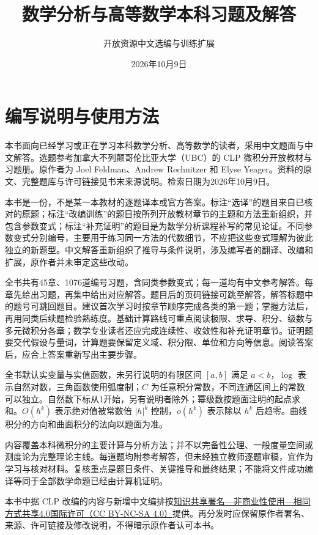 \documentclass[12pt,fontset=fandol]{ctexart}
\title{数学分析与高等数学本科习题及解答}
\author{开放资源中文选编与训练扩展}
\date{2026年10月9日}
\begin{document}
\maketitle
\section*{编写说明与使用方法}
本书面向已经学习或正在学习本科数学分析、高等数学的读者，采用中文题面与中文解答。选题参考加拿大不列颠哥伦比亚大学（UBC）的 CLP 微积分开放教材与习题册。原作者为 Joel Feldman、Andrew Rechnitzer 和 Elyse Yeager。资料的原文、完整题库与许可链接见书末来源说明。检索日期为2026年10月9日。

本书是一份，不是某一本教材的逐题译本或官方答案。标注“选译”的题目来自已核对的原题；标注“改编训练”的题目按所列开放教材章节的主题和方法重新组织，并包含参数变式；标注“补充证明”的题目是为数学分析课程补写的常见论证。不同参数变式分别编号，主要用于练习同一方法的代数细节，不应把这些变式理解为彼此独立的新题型。中文解答重新组织了推导与条件说明，涉及编写者的翻译、改编和扩展，原作者并未审定这些改动。

全书共有45章、1076道编号习题，含同类参数变式；每一道均有中文参考解答。每章先给出习题，再集中给出对应解答。题目后的页码链接可跳至解答，解答标题中的题号可跳回题目。建议首次学习时按章节顺序完成各类的第一题；掌握方法后，再用同类后续题检验熟练度。基础计算路线可重点阅读极限、求导、积分、级数与多元微积分各章；数学专业读者还应完成连续性、收敛性和补充证明章节。证明题要交代假设与量词，计算题要保留定义域、积分限、单位和方向等信息。阅读答案后，应合上答案重新写出主要步骤。

全书默认实变量与实值函数，未另行说明的有限区间 $[a,b]$ 满足 $a<b$，$\log$ 表示自然对数，三角函数使用弧度制；$C$ 为任意积分常数，不同连通区间上的常数可以独立。自然数下标从1开始，另有说明者除外；幂级数按题面注明的起点求和。$O(h^k)$ 表示绝对值被常数倍 $|h|^k$ 控制，$o(h^k)$ 表示除以 $h^k$ 后趋零。曲线积分的方向和曲面积分的法向以题面为准。

内容覆盖本科微积分的主要计算与分析方法；并不以完备性公理、一般度量空间或测度论为完整理论主线。每道题均附参考解答，但未经独立教师逐题审稿，宜作为学习与核对材料。复核重点是题目条件、关键推导和最终结果；不能将文件成功编译等同于全部数学命题已经由计算机证明。

本书中据 CLP 改编的内容与新增中文编排按\href{https://creativecommons.org/licenses/by-nc-sa/4.0/}{知识共享署名—非商业性使用—相同方式共享4.0国际许可（CC BY-NC-SA 4.0）}提供。再分发时应保留原作者署名、来源、许可链接及修改说明，不得暗示原作者认可本书。
\tableofcontents
\clearpage
\end{document}
